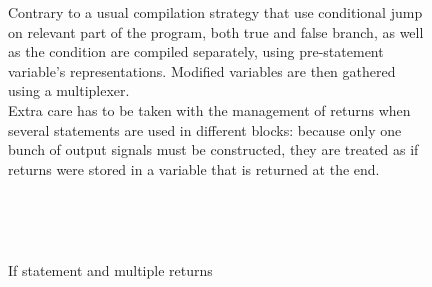 \documentclass[10pt,a4paper]{article}
\begin{document}
\begin{figure}[h]
	\centering
	\begin{minipage}{.7\textwidth}
\quad Contrary to a usual compilation strategy that use conditional jump on relevant part of the program, both true and false branch, as well as the condition are compiled separately, using pre-statement variable's representations. Modified variables are then gathered using a multiplexer. \\

\quad Extra care has to be taken with the management of returns when several statements are used in different blocks: because only one bunch of output signals must be constructed, they are treated as if returns were stored in a variable that is returned at the end.

	
	~	
	\qquad	{}
	\end{minipage}~~
	\begin{minipage}{.28\textwidth}
	\end{minipage}
	\caption{If statement and multiple returns}
\end{figure}
\end{document}
